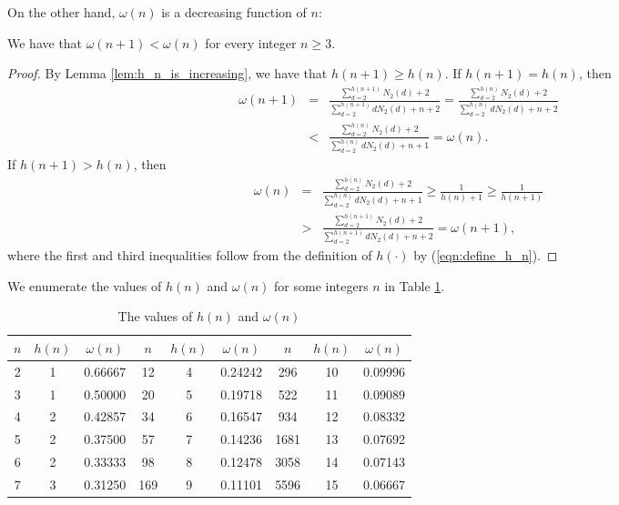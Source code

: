 \documentclass[JMC]{degruyter-journal}
\begin{document}
On the other hand, $\omega(n)$ is a decreasing function of $n$:
\begin{lemma}\label{lem:omega_n_is_decreasing}
We have that $\omega(n+1)< \omega(n)$ for every  integer
$n\geq 3$.
\end{lemma}
\begin{proof}
By Lemma \ref{lem:h_n_is_increasing}, we have that  $h(n+1)\geq
h(n)$.  If $h(n+1)=h(n)$, then
\begin{eqnarray*}
\omega(n+1)&=&\frac{\sum_{d=2}^{h(n+1)}N_2(d)+2}{\sum_{d=2}^{h(n+1)}dN_2(d)+n+2}
=\frac{\sum_{d=2}^{h(n)}N_2(d)+2}{\sum_{d=2}^{h(n)}dN_2(d)+n+2} \\
&<&
\frac{\sum_{d=2}^{h(n)}N_2(d)+2}{\sum_{d=2}^{h(n)}dN_2(d)+n+1}=\omega(n).
\end{eqnarray*}
If $h(n+1)>h(n)$, then
\begin{eqnarray*}
\omega(n)&=&\frac{\sum_{d=2}^{h(n)}N_2(d)+2}{\sum_{d=2}^{h(n)}dN_2(d)+n+1}\geq
\frac{1}{h(n)+1} \geq
\frac{1}{h(n+1)}\\
&>&
\frac{\sum_{d=2}^{h(n+1)}N_2(d)+2}{\sum_{d=2}^{h(n+1)}dN_2(d)+n+2}=
\omega(n+1),
\end{eqnarray*}
where the first and third inequalities follow from the
definition of   $h(\cdot)$ by 
(\ref{eqn:define_h_n}).
\end{proof}













We enumerate  the values of $h(n)$ and $\omega(n)$ for some integers $n$  in Table \ref{table:h_n}.

\begin{table}[t]
\begin{center}
    \begin{tabular}{|c|c|c||c|c|c||c|c|c|}\hline
$n$   & $h(n)$ & $\omega(n)$ & $n$  & $h(n)$ & $\omega(n)$ & $n$  & $h(n)$ & $\omega(n)$ \\ \hline\hline
2 &   1    & 0.66667    &  12 &   4    & 0.24242  & 296 &  10    & 0.09996   \\ \hline
3 &   1    & 0.50000    &  20 &   5    & 0.19718  & 522 &  11 & 0.09089\\ \hline
4 &   2    & 0.42857    &  34 &   6    & 0.16547  & 934 &  12 & 0.08332\\ \hline
5 &   2    & 0.37500    &  57 &   7    & 0.14236  & 1681 &  13 & 0.07692\\ \hline
6 &   2    & 0.33333    &  98 &   8    & 0.12478  & 3058 &  14 & 0.07143\\ \hline
7 &   3    & 0.31250    &  169 &   9    & 0.11101 & 5596 &  15 & 0.06667\\ \hline
     \end{tabular}
    \end{center}
    \caption{The values of $h(n)$ and $\omega(n)$}
    \label{table:h_n}
\end{table}
\end{document}
